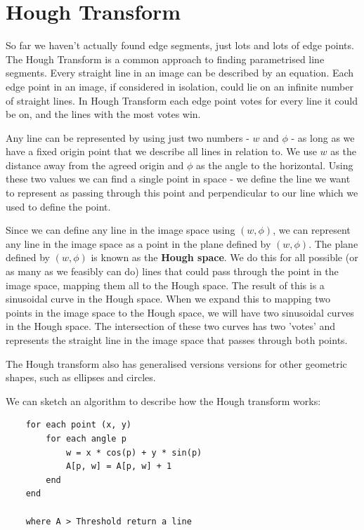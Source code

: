 \documentclass{article}
\begin{document}
	\section{Hough Transform}
	So far we haven't actually found edge segments, just lots and lots of edge points. The Hough Transform is a common approach to finding parametrised line segments. Every straight line in an image can be described by an equation. Each edge point in an image, if considered in isolation, could lie on an infinite number of straight lines. In Hough Transform each edge point votes for every line it could be on, and the lines with the most votes win.
	
	\par
	Any line can be represented by using just two numbers - $w$ and $\phi$ - as long as we have a fixed origin point that we describe all lines in relation to. We use $w$ as the distance away from the agreed origin and $\phi$ as the angle to the horizontal. Using these two values we can find a single point in space - we define the line we want to represent as passing through this point and perpendicular to our line which we used to define the point. 
	
	\par 
	Since we can define any line in the image space using $(w, \phi)$, we can represent any line in the image space as a point in the plane defined by $(w, \phi)$. The plane defined by $(w, \phi)$ is known as the \textbf{Hough space}. We do this for all possible (or as many as we feasibly can do) lines that could pass through the point in the image space, mapping them all to the Hough space. The result of this is a sinusoidal curve in the Hough space. When we expand this to mapping two points in the image space to the Hough space, we will have two sinusoidal curves in the Hough space. The intersection of these two curves has two 'votes' and represents the straight line in the image space that passes through both points. 	
	
	The Hough transform also has generalised versions versions for other geometric shapes, such as ellipses and circles.
	
	\par 
	We can sketch an algorithm to describe how the Hough transform works:
	
	\begin{verbatim}
	for each point (x, y)
	    for each angle p
	        w = x * cos(p) + y * sin(p)
	        A[p, w] = A[p, w] + 1
	    end
	end
	
	where A > Threshold return a line
	\end{verbatim}
	
\end{document}
